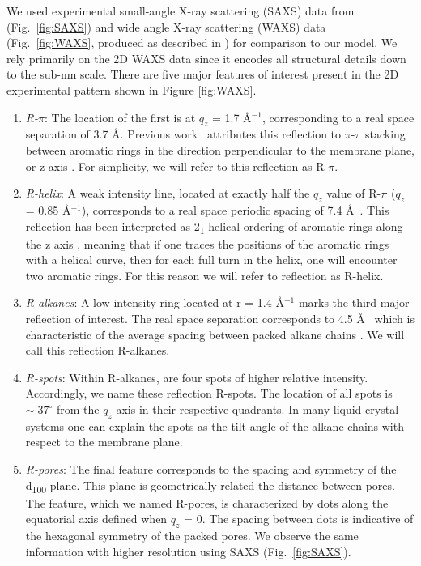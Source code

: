 \documentclass[journal=jpcbfk,manusciprt=article]{achemso}
\begin{document}
  We used experimental small-angle X-ray scattering (SAXS) data from
  \cite{feng_thin_2016} (Fig.~\ref{fig:SAXS}) and wide angle X-ray scattering
  (WAXS) data (Fig.~\ref{fig:WAXS}, produced as described in
  \cite{feng_scalable_2014}) for comparison to our model. We rely primarily on the 2D WAXS data
  since it encodes all structural details down to the sub-nm scale.  There are
  five major features of interest present in the 2D experimental pattern shown in
  Figure \ref{fig:WAXS}.

  \begin{enumerate} 
  
	\item \textit{R-$\pi$}: The location of the first is at $q_z$ = 1.7
	\AA$^{-1}$, corresponding to a real space separation of 3.7 {\AA}. Previous
	work~\cite{feng_scalable_2014} attributes this reflection to $\pi$-$\pi$
	stacking between aromatic rings in the direction perpendicular to the membrane
	plane, or z-axis \cite{feng_scalable_2014}. For simplicity, we will refer to
	this reflection as R-$\pi$.
 
	\item \textit{R-helix}: A weak intensity line, located at exactly half
	the $q_z$ value of R-$\pi$ ($q_z$ = 0.85 \AA$^{-1}$), corresponds to a real
	space periodic spacing of 7.4 \AA~. This reflection has been interpreted as
	2\textsubscript{1} helical ordering of aromatic rings along the z axis
	\cite{feng_scalable_2014}, meaning that if one traces the positions of the
	aromatic rings with a helical curve, then for each full turn in the helix, one
	will encounter two aromatic rings. For this reason we will refer to reflection
	as R-helix. 

	\item \textit{R-alkanes}: A low intensity ring located at r = 1.4
	\AA$^{-1}$ marks the third major reflection of interest. The real space
	separation corresponds to 4.5 \AA~ which is characteristic of the average
	spacing between packed alkane chains \cite{mcintosh_organization_1980}. We will
	call this reflection R-alkanes.

	\item \textit{R-spots}: Within R-alkanes, are four spots of higher
	relative intensity.  Accordingly, we name these reflection R-spots. The
	location of all spots is $\sim\;37^{\circ}$ from the $q_z$ axis in their
	respective quadrants. In many liquid crystal systems one can explain the spots
	as the tilt angle of the alkane chains with respect to the membrane
	plane\cite{govind_simple_2001}.
 
	\item \textit{R-pores}: The final feature corresponds to the spacing
	and symmetry of the d\textsubscript{100} plane. This plane is geometrically
	related the distance between pores. The feature, which we named R-pores, is
	characterized by dots along the equatorial axis defined when $q_z$ = 0. The
	spacing between dots is indicative of the hexagonal symmetry of the packed
	pores. We observe the same information with higher resolution using SAXS
	(Fig.~\ref{fig:SAXS}). 

  \end{enumerate}
\end{document}

